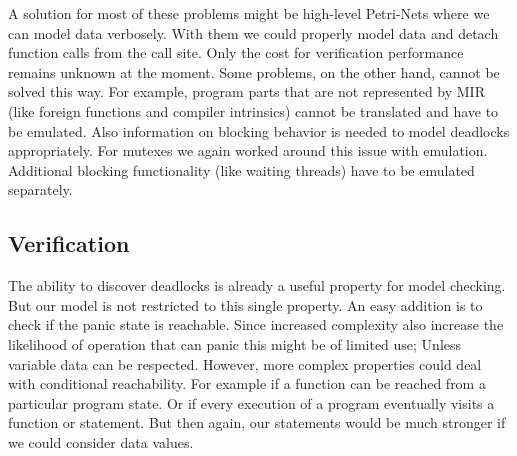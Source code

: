 A solution for most of these problems might be high-level Petri-Nets where we can model data verbosely.
With them we could properly model data and detach function calls from the call site.
Only the cost for verification performance remains unknown at the moment.
Some problems, on the other hand, cannot be solved this way.
For example, program parts that are not represented by MIR (like foreign functions and compiler intrinsics) cannot be translated and have to be emulated.
Also information on blocking behavior is needed to model deadlocks appropriately.
For mutexes we again worked around this issue with emulation.
Additional blocking functionality (like waiting threads) have to be emulated separately.

\subsection{Verification}
The ability to discover deadlocks is already a useful property for model checking.
But our model is not restricted to this single property.
An easy addition is to check if the panic state is reachable.
Since increased complexity also increase the likelihood of operation that can panic this might be of limited use;
Unless variable data can be respected.
However, more complex properties could deal with conditional reachability.
For example if a function can be reached from a particular program state.
Or if every execution of a program eventually visits a function or statement.
But then again, our statements would be much stronger if we could consider data values.

